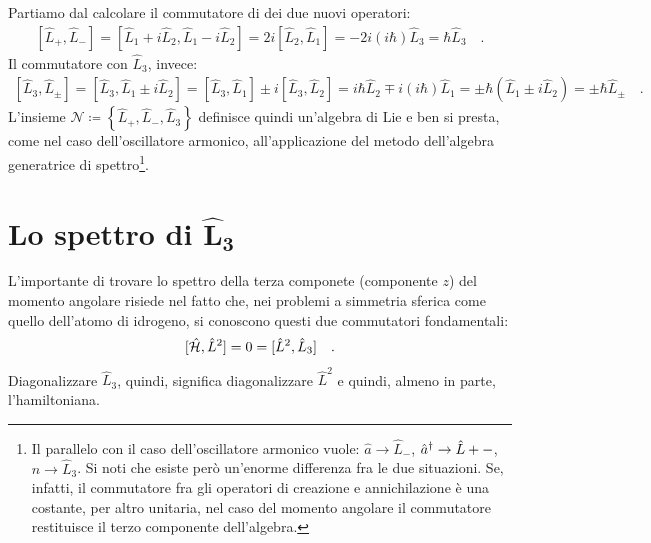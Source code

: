 Partiamo dal calcolare il commutatore di dei due nuovi operatori:
\[
    \begin{aligned}
        [\hat{L}_+, \hat{L}_-] = [\hat{L}_1 + i\hat{L}_2, \hat{L}_1 - i\hat{L}_2] = 2i[\hat{L}_2, \hat{L}_1] = - 2i (i\hbar)\hat{L}_3 = \hbar \hat{L}_3 \quad.
    \end{aligned}
\]
Il commutatore con $\hat{L}_3$, invece:
\[
    \begin{aligned}
        [\hat{L}_3, \hat{L}_\pm] = [\hat{L}_3, \hat{L}_1 \pm i\hat{L}_2] = [\hat{L}_3, \hat{L}_1] \pm i[\hat{L}_3, \hat{L}_2] = i\hbar\hat{L}_2 \mp i (i\hbar) \hat{L}_1 = \pm\hbar(\hat{L}_1 \pm i\hat{L}_2) = \pm \hbar \hat{L}_{\pm} \quad.
    \end{aligned}
\]  
L'insieme $\mathcal{N} \coloneq \left\{ \hat{L}_+, \hat{L}_-, \hat{L}_3 \right\}$ definisce quindi un'algebra di Lie e ben si presta, come nel caso dell'oscillatore armonico, all'applicazione del metodo dell'algebra generatrice di spettro\footnote{Il parallelo con il caso dell'oscillatore armonico vuole: $\hat{a} \to \hat{L}_-$, $\hat{{a}}^\dagger \to \hat{L}+-$, $\hat{n} \to \hat{L}_3$. Si noti che esiste però un'enorme differenza fra le due situazioni. Se, infatti, il commutatore fra gli operatori di creazione e annichilazione è una costante, per altro unitaria, nel caso del momento angolare il commutatore restituisce il terzo componente dell'algebra.}.

\section{Lo spettro di \texorpdfstring{$\bm{\hat{L}_3}$}{L3}}
L'importante di trovare lo spettro della terza componete (componente $z$) del momento angolare risiede nel fatto che, nei problemi a simmetria sferica come quello dell'atomo di idrogeno, si conoscono questi due commutatori fondamentali:
\[
    [\hat{\mathcal{H}}, \hat{L}^2] = 0 = [\hat{L}^2, \hat{L}_3] \quad.
\]
Diagonalizzare $\hat{L}_3$, quindi, significa diagonalizzare $\hat{L}^2$ e quindi, almeno in parte, l'hamiltoniana. 
